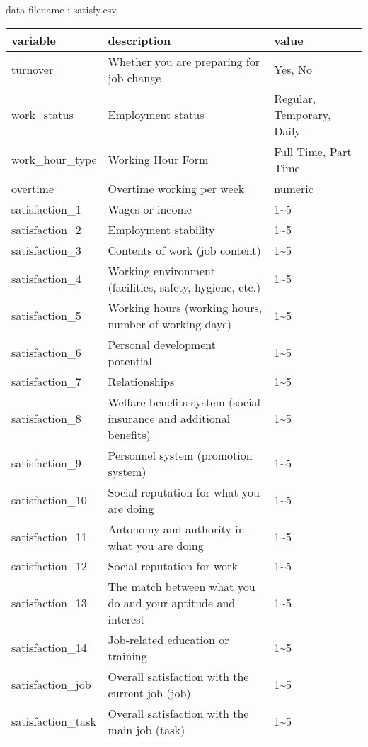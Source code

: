 \documentclass[
]{book}
\begin{document}
data filename : satisfy.csv

\begin{tabular}{l|l|l}
\hline
variable & description & value\\
\hline
turnover & Whether you are preparing for job change & Yes, No\\
\hline
work\_status & Employment status & Regular, Temporary, Daily\\
\hline
work\_hour\_type & Working Hour Form & Full Time, Part Time\\
\hline
overtime & Overtime working per week & numeric\\
\hline
satisfaction\_1 & Wages or income & 1\textasciitilde{}5\\
\hline
satisfaction\_2 & Employment stability & 1\textasciitilde{}5\\
\hline
satisfaction\_3 & Contents of work (job content) & 1\textasciitilde{}5\\
\hline
satisfaction\_4 & Working environment (facilities, safety, hygiene, etc.) & 1\textasciitilde{}5\\
\hline
satisfaction\_5 & Working hours (working hours, number of working days) & 1\textasciitilde{}5\\
\hline
satisfaction\_6 & Personal development potential & 1\textasciitilde{}5\\
\hline
satisfaction\_7 & Relationships & 1\textasciitilde{}5\\
\hline
satisfaction\_8 & Welfare benefits system (social insurance and additional benefits) & 1\textasciitilde{}5\\
\hline
satisfaction\_9 & Personnel system (promotion system) & 1\textasciitilde{}5\\
\hline
satisfaction\_10 & Social reputation for what you are doing & 1\textasciitilde{}5\\
\hline
satisfaction\_11 & Autonomy and authority in what you are doing & 1\textasciitilde{}5\\
\hline
satisfaction\_12 & Social reputation for work & 1\textasciitilde{}5\\
\hline
satisfaction\_13 & The match between what you do and your aptitude and interest & 1\textasciitilde{}5\\
\hline
satisfaction\_14 & Job-related education or training & 1\textasciitilde{}5\\
\hline
satisfaction\_job & Overall satisfaction with the current job (job) & 1\textasciitilde{}5\\
\hline
satisfaction\_task & Overall satisfaction with the main job (task) & 1\textasciitilde{}5\\

\end{tabular}
\end{document}
